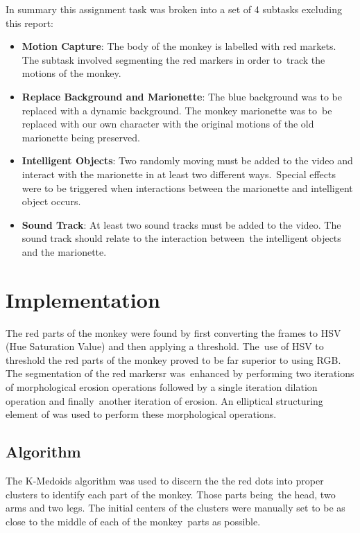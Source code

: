 \documentclass[12pt,a4paper]{article}
\begin{document}
      In summary this assignment task was broken into a set of 4  subtasks excluding this report:
      \begin{itemize}
        \item \textbf{Motion Capture}: The body of the monkey is labelled with red markets. The subtask involved segmenting the red markers in order to\
        track the motions of the monkey.
        \item \textbf{Replace Background and Marionette}: The blue background was to be replaced with a dynamic background. The monkey marionette was to\
        be replaced with our own character with the original motions of the old marionette being preserved.
        \item \textbf{Intelligent Objects}: Two randomly moving must be added to the video and interact with the marionette in at least two different ways.\
        Special effects were to be triggered when interactions between the marionette and intelligent object occurs.
        \item \textbf{Sound Track}: At least two sound tracks must be added to the video. The sound track should relate to the interaction between\
        the intelligent objects and the marionette.
      \end{itemize}

    \section{Implementation}
    The red parts of the monkey were found by first converting the frames to HSV (Hue Saturation Value) and then applying a threshold. The\
    use of HSV to threshold the red parts of the monkey proved to be far superior to using RGB. The segmentation of the red markersr was\
    enhanced by performing two iterations of morphological erosion operations followed by a single iteration dilation operation and finally\
    another iteration of erosion. An elliptical structuring element of was used to perform these morphological operations.

      \subsection{Algorithm}
      The K-Medoids algorithm was used to discern the the red dots into proper clusters to identify each part of the monkey. Those parts being\
      the head, two arms and two legs. The initial centers of the clusters were manually set to be as close to the middle of each of the monkey\
      parts as possible.
\end{document}
